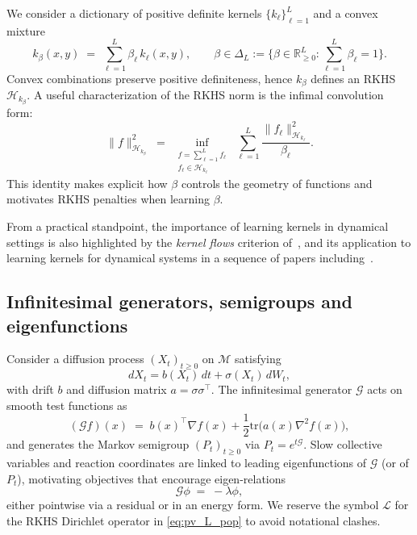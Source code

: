 \documentclass[11pt]{article}
\theoremstyle{remark}
\newcommand{\Hk}{\mathcal{H}}
\begin{document}
We consider a dictionary of positive definite kernels $\{k_\ell\}_{\ell=1}^L$ and a convex mixture
\begin{equation}
k_\beta(x,y)\;=\;\sum_{\ell=1}^L \beta_\ell\, k_\ell(x,y),
\qquad
\beta\in\Delta_L
:=\Big\{\beta\in\mathbb{R}^L_{\ge 0}:\sum_{\ell=1}^L \beta_\ell=1\Big\}.
\label{eq:kernel-mixture-bg}
\end{equation}
Convex combinations preserve positive definiteness, hence $k_\beta$ defines an RKHS $\Hk_{k_\beta}$.
A useful characterization of the RKHS norm is the infimal convolution form:
\begin{equation}
\|f\|^2_{\mathcal{H}_{k_\beta}}
\;=\;
\inf_{\substack{f=\sum_{\ell=1}^L f_\ell\\ f_\ell\in \mathcal{H}_{k_\ell}}}
\ \sum_{\ell=1}^L \frac{\|f_\ell\|^2_{\mathcal{H}_{k_\ell}}}{\beta_\ell}.
\label{eq:rkhs-mixture-norm}
\end{equation}
This identity makes explicit how $\beta$ controls the geometry of functions and motivates RKHS penalties when learning $\beta$.

From a practical standpoint, the importance of learning kernels in dynamical settings is also highlighted by the \emph{kernel flows} criterion of~\citet{owhadi2019kernel}, and its application to learning kernels for dynamical systems in a sequence of papers including~\citet{hamzi2021learning,darcy2025learning}.

\subsection{Infinitesimal generators, semigroups and eigenfunctions}
\label{subsec:generators}

Consider a diffusion process $(X_t)_{t\ge 0}$ on $\mathcal{M}$ satisfying
\begin{equation}
dX_t = b(X_t)\,dt + \sigma(X_t)\, dW_t,
\end{equation}
with drift $b$ and diffusion matrix $a=\sigma\sigma^\top$.
The infinitesimal generator $\mathcal{G}$ acts on smooth test functions as
\begin{equation}
(\mathcal{G}f)(x)
\;=\;
b(x)^\top \nabla f(x)
+\frac12 \mathrm{tr}\!\big(a(x)\nabla^2 f(x)\big),
\label{eq:generator}
\end{equation}
and generates the Markov semigroup $(P_t)_{t\ge 0}$ via $P_t=e^{t\mathcal{G}}$.
Slow collective variables and reaction coordinates are linked to leading eigenfunctions of $\mathcal{G}$ (or of $P_t$), motivating objectives that encourage eigen-relations
\begin{equation}
\mathcal{G}\phi \;=\; -\lambda \phi,
\label{eq:gen-eigen}
\end{equation}
either pointwise via a residual or in an energy form.
We reserve the symbol $\mathcal{L}$ for the RKHS Dirichlet operator in \eqref{eq:pv_L_pop} to avoid notational clashes.
\end{document}
